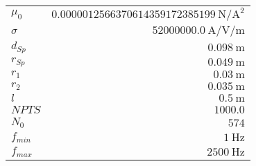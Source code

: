 
{%
    \begin{center}
    \label{tab:fitparams:cu:L}
    \begin{tabular}{lr}
    \toprule
        $\mu_0$ & $\SI{0.0000012566370614359172385199}{\newton\per\ampere\squared}$\\
        $\sigma$ & $\SI{52000000.0}{\ampere\per\volt\per\meter}$\\
        $d_{Sp}$ & $\SI{0.098}{\meter}$\\
        $r_{Sp}$ & $\SI{0.049}{\meter}$\\
        $r_1$ & $\SI{0.03}{\meter}$\\
        $r_2$ & $\SI{0.035}{\meter}$\\
        $l$ & $\SI{0.5}{\meter}$\\
        $NPTS$ & $\num{1000.0}$\\
        $N_0$ & $\num{574}$\\
        $f_{min}$ & $\SI{1}{\hertz}$\\
        $f_{max}$ & $\SI{2500}{\hertz}$\\

    \bottomrule
    \end{tabular}
    \end{center}
}

